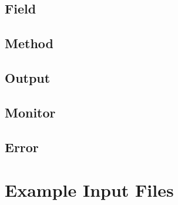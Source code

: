 \subsection{Field}
\subsection{Method}
\subsection{Output}
\subsection{Monitor}
\subsection{Error}

\section{Example Input Files} \label{s:input-examples}
